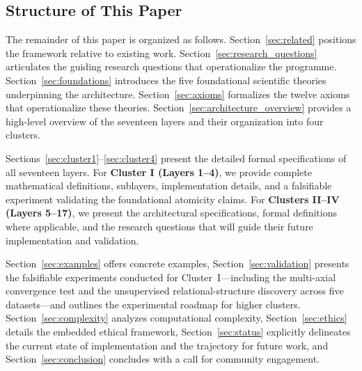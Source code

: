 \subsection{Structure of This Paper}
\label{subsec:structure}

The remainder of this paper is organized as follows. Section~\ref{sec:related} positions the framework relative to existing work. Section~\ref{sec:research_questions} articulates the guiding research questions that operationalize the programme. Section~\ref{sec:foundations} introduces the five foundational scientific theories underpinning the architecture. Section~\ref{sec:axioms} formalizes the twelve axioms that operationalize these theories. Section~\ref{sec:architecture_overview} provides a high-level overview of the seventeen layers and their organization into four clusters.

Sections~\ref{sec:cluster1}--\ref{sec:cluster4} present the detailed formal specifications of all seventeen layers. For \textbf{Cluster I (Layers 1--4)}, we provide complete mathematical definitions, sublayers, implementation details, and a falsifiable experiment validating the foundational atomicity claims. For \textbf{Clusters II--IV (Layers 5--17)}, we present the architectural specifications, formal definitions where applicable, and the research questions that will guide their future implementation and validation.

Section~\ref{sec:examples} offers concrete examples, Section~\ref{sec:validation} presents the falsifiable experiments conducted for Cluster~I---including the multi-axial convergence test and the unsupervised relational-structure discovery across five datasets---and outlines the experimental roadmap for higher clusters. Section~\ref{sec:complexity} analyzes computational complexity, Section~\ref{sec:ethics} details the embedded ethical framework, Section~\ref{sec:status} explicitly delineates the current state of implementation and the trajectory for future work, and Section~\ref{sec:conclusion} concludes with a call for community engagement.

